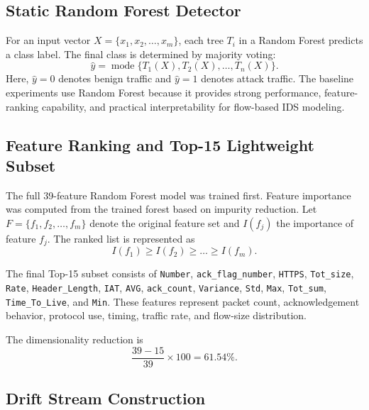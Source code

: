 \documentclass[11pt,a4paper]{article}
\newcommand{\feat}[1]{\texttt{#1}}
\begin{document}
\subsection{Static Random Forest Detector}

For an input vector $X = \{x_1, x_2, \ldots, x_m\}$, each tree $T_i$ in a
Random Forest predicts a class label. The final class is determined by
majority voting:
%
\begin{equation}
\hat{y} = \operatorname{mode}\{T_1(X), T_2(X), \ldots, T_n(X)\}.
\end{equation}
%
Here, $\hat{y} = 0$ denotes benign traffic and $\hat{y} = 1$ denotes
attack traffic. The baseline experiments use Random Forest because it
provides strong performance, feature-ranking capability, and practical
interpretability for flow-based IDS modeling.

\subsection{Feature Ranking and Top-15 Lightweight Subset}

The full 39-feature Random Forest model was trained first. Feature
importance was computed from the trained forest based on impurity
reduction. Let $F = \{f_1, f_2, \ldots, f_m\}$ denote the original
feature set and $I(f_j)$ the importance of feature $f_j$. The ranked list
is represented as
%
\begin{equation}
I(f_1) \geq I(f_2) \geq \ldots \geq I(f_m).
\end{equation}
%
\begin{sloppypar}
The final Top-15 subset consists of \feat{Number},
\feat{ack\_flag\_number}, \feat{HTTPS}, \feat{Tot\_size}, \feat{Rate},
\feat{Header\_Length}, \feat{IAT}, \feat{AVG}, \feat{ack\_count},
\feat{Variance}, \feat{Std}, \feat{Max}, \feat{Tot\_sum},
\feat{Time\_To\_Live}, and \feat{Min}. These features represent packet
count, acknowledgement behavior, protocol use, timing, traffic rate, and
flow-size distribution.
\end{sloppypar}
The dimensionality reduction is
%
\begin{equation}
\frac{39 - 15}{39} \times 100 = 61.54\%.
\end{equation}

\subsection{Drift Stream Construction}
\label{sec:stream}
\end{document}
